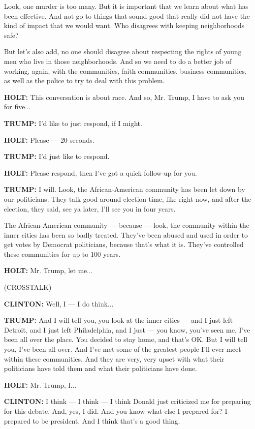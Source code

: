 Look, one murder is too many. But it is important that we learn about
what has been effective. And not go to things that sound good that
really did not have the kind of impact that we would want. Who disagrees
with keeping neighborhoods safe?

But let's also add, no one should disagree about respecting the rights
of young men who live in those neighborhoods. And so we need to do a
better job of working, again, with the communities, faith communities,
business communities, as well as the police to try to deal with this
problem.

\textbf{HOLT:} This conversation is about race. And so, Mr. Trump, I
have to ask you for five...

\textbf{TRUMP:} I'd like to just respond, if I might.

\textbf{HOLT:} Please --- 20 seconds.

\textbf{TRUMP:} I'd just like to respond.

\textbf{HOLT:} Please respond, then I've got a quick follow-up for you.

\textbf{TRUMP:} I will. Look, the African-American community has been
let down by our politicians. They talk good around election time, like
right now, and after the election, they said, see ya later, I'll see you
in four years.

The African-American community --- because --- look, the community
within the inner cities has been so badly treated. They've been abused
and used in order to get votes by Democrat politicians, because that's
what it is. They've controlled these communities for up to 100 years.

\textbf{HOLT:} Mr. Trump, let me...

(CROSSTALK)

\textbf{CLINTON:} Well, I --- I do think...

\textbf{TRUMP:} And I will tell you, you look at the inner cities ---
and I just left Detroit, and I just left Philadelphia, and I just ---
you know, you've seen me, I've been all over the place. You decided to
stay home, and that's OK. But I will tell you, I've been all over. And
I've met some of the greatest people I'll ever meet within these
communities. And they are very, very upset with what their politicians
have told them and what their politicians have done.

\textbf{HOLT:} Mr. Trump, I...

\textbf{CLINTON:} I think --- I think --- I think Donald just criticized
me for preparing for this debate. And, yes, I did. And you know what
else I prepared for? I prepared to be president. And I think that's a
good thing.

